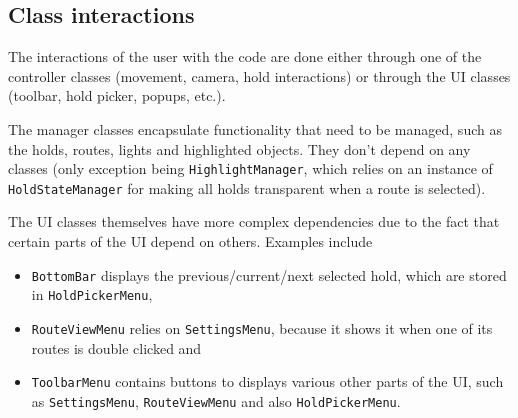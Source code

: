 \subsection{Class interactions}

The interactions of the user with the code are done either through one of the controller classes (movement, camera, hold interactions) or through the UI classes (toolbar, hold picker, popups, etc.).

The manager classes encapsulate functionality that need to be managed, such as the holds, routes, lights and highlighted objects.
They don't depend on any classes (only exception being \verb|HighlightManager|, which relies on an instance of \verb|HoldStateManager| for making all holds transparent when a route is selected).

The UI classes themselves have more complex dependencies due to the fact that certain parts of the UI depend on others. 
Examples include
\begin{itemize}
		\item \verb|BottomBar| displays the previous/current/next selected hold, which are stored in \verb|HoldPickerMenu|,
		\item \verb|RouteViewMenu| relies on \verb|SettingsMenu|, because it shows it when one of its routes is double clicked and
		\item \verb|ToolbarMenu| contains buttons to displays various other parts of the UI, such as \verb|SettingsMenu|, \verb|RouteViewMenu| and also \verb|HoldPickerMenu|.
\end{itemize}
